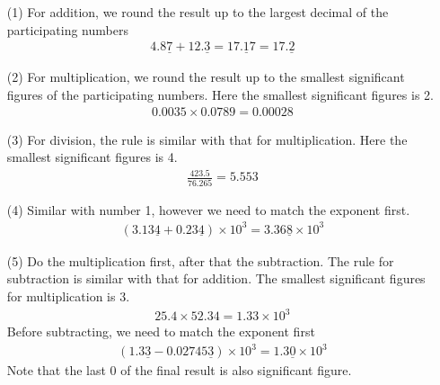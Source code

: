 \documentclass[floatfix,nofootinbib,superscriptaddress,fleqn,preprint]{revtex4}
\begin{document}
\vspace{1 cm}
\begin{itemize}
  \item[(1)] For addition, we round the result up to the largest decimal of the participating numbers
  \begin{align}
    4.8\underline{7} + 12.\underline{3} = 17.\underline{1}7 = 17.\underline{2}
  \end{align} 
  \item[(2)] For multiplication, we round the result up to the smallest significant figures of the participating numbers. Here the smallest significant figures is 2.
  \begin{align}
    0.0035 \times 0.0789 = 0.00028
  \end{align} 
  \item[(3)] For division, the rule is similar with that for multiplication. Here the smallest significant figures is 4.
  \begin{align}
    \frac{423.5}{76.265} = 5.553
  \end{align} 
  \item[(4)] Similar with number 1, however we need to match the exponent first.
  \begin{align}
    (3.13\underline{4} + 0.23\underline{4})\times 10^3 = 3.36\underline{8}\times 10^3
  \end{align} 
  \item[(5)] Do the multiplication first, after that the subtraction. The rule for subtraction is similar with that for addition. The smallest significant figures for multiplication is 3.
  \begin{align}
    25.4 \times 52.34 = 1.33\times 10^3
  \end{align} 
  Before subtracting, we need to match the exponent first
  \begin{align}
    (1.3\underline{3}-0.02745\underline{3})\times 10^3 = 1.3\underline{0} \times 10^3
  \end{align}
  Note that the last 0 of the final result is also significant figure.
\end{itemize}
\end{document}
